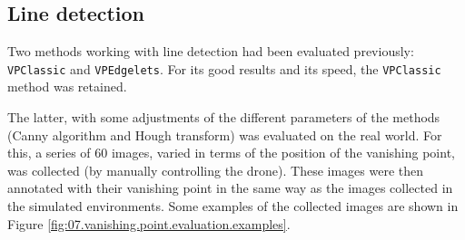 \subsection{Line detection}

Two methods working with line detection had been evaluated previously: \texttt{VPClassic} and \texttt{VPEdgelets}. For its good results and its speed, the \texttt{VPClassic} method was retained.

The latter, with some adjustments of the different parameters of the methods (Canny algorithm and Hough transform) was evaluated on the real world. For this, a series of $\num{60}$ images, varied in terms of the position of the vanishing point, was collected (by manually controlling the drone). These images were then annotated with their vanishing point in the same way as the images collected in the simulated environments. Some examples of the collected images are shown in Figure \ref{fig:07.vanishing.point.evaluation.examples}.

